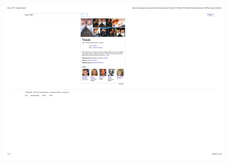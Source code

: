 \documentclass[mathserif,12pt]{beamer}
\begin{document}
\begin{frame}
\begin{columns}
\begin{column}{0.55\textwidth}
\begin{figure}
\end{figure}
 \end{column}

 \begin{column}{0.45\textwidth}
 \vspace{-3cm}
 \begin{figure}
  \includegraphics[scale=0.45]{figures/titanic} 
 \end{figure}
 \end{column}
\end{columns}
\end{frame}
\end{document}
